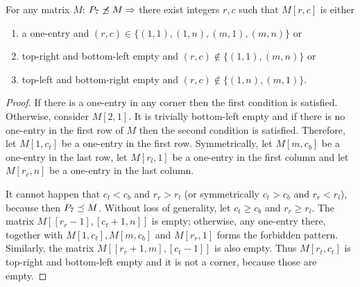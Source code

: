 \begin{lemma}
\label{lemma:p33}
For any matrix $M$: $P_7\not\preceq M\Rightarrow$ there exist integers $r,c$ such that $M[r,c]$ is either
\begin{enumerate}
\item a one-entry and $(r,c)\in\{(1,1),(1,n),(m,1),(m,n)\}$ or
\item top-right and bottom-left empty and $(r,c)\not\in\{(1,1),(m,n)\}$ or
\item top-left and bottom-right empty and $(r,c)\not\in\{(1,n),(m,1)\}$.
\end{enumerate}
\end{lemma}
\begin{proof}
If there is a one-entry in any corner then the first condition is satisfied. Otherwise, consider $M[2,1]$. It is trivially bottom-left empty and if there is no one-entry in the first row of $M$ then the second condition is satisfied. Therefore, let $M[1,c_t]$ be a one-entry in the first row. Symmetrically, let $M[m,c_b]$ be a one-entry in the last row, let $M[r_l,1]$ be a one-entry in the first column and let $M[r_r,n]$ be a one-entry in the last column.

It cannot happen that $c_t<c_b$ and $r_r>r_l$ (or symmetrically $c_t>c_b$ and $r_r<r_l$), because then $P_7\preceq M$. Without loss of generality, let $c_t\geq c_b$ and $r_r\geq r_l$. The matrix $M[[r_r-1],[c_t+1,n]]$ is empty; otherwise, any one-entry there, together with $M[1,c_t],M[m,c_b]$ and $M[r_r,1]$ forms the forbidden pattern. Similarly, the matrix $M[[r_r+1,m],[c_t-1]]$ is also empty. Thus $M[r_t,c_t]$ is top-right and bottom-left empty and it is not a corner, because those are empty.
\end{proof}

